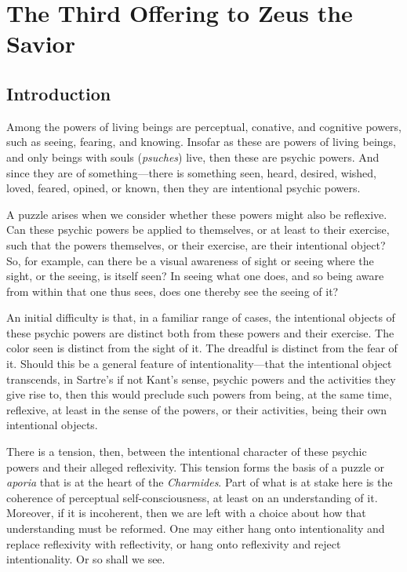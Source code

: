 \chapter{The Third Offering to Zeus the Savior} %
\label{cha:offering}

\section{Introduction} %
\label{sec:introduction}

Among the powers of living beings are perceptual, conative, and cognitive powers, such as seeing, fearing, and knowing. Insofar as these are powers of living beings, and only beings with souls (\emph{psuches}) live, then these are psychic powers. And since they are of something—there is something seen, heard, desired, wished, loved, feared, opined, or known, then they are intentional psychic powers.

A puzzle arises when we consider whether these powers might also be reflexive. Can these psychic powers be applied to themselves, or at least to their exercise, such that the powers themselves, or their exercise, are their intentional object? So, for example, can there be a visual awareness of sight or seeing where the sight, or the seeing, is itself seen? In seeing what one does, and so being aware from within that one thus sees, does one thereby see the seeing of it? 

An initial difficulty is that, in a familiar range of cases, the intentional objects of these psychic powers are distinct both from these powers and their exercise. The color seen is distinct from the sight of it. The dreadful is distinct from the fear of it. Should this be a general feature of intentionality—that the intentional object transcends, in Sartre's if not Kant's sense, psychic powers and the activities they give rise to, then this would preclude such powers from being, at the same time, reflexive, at least in the sense of the powers, or their activities, being their own intentional objects.

There is a tension, then, between the intentional character of these psychic powers and their alleged reflexivity. This tension forms the basis of a puzzle or \emph{aporia} that is at the heart of the \emph{Charmides}. Part of what is at stake here is the coherence of perceptual self-consciousness, at least on an understanding of it. Moreover, if it is incoherent, then we are left with a choice about how that understanding must be reformed. One may either hang onto intentionality and replace reflexivity with reflectivity, or hang onto reflexivity and reject intentionality. Or so shall we see.

